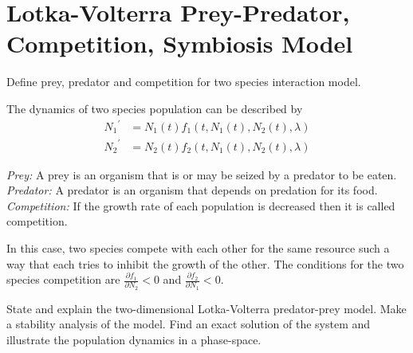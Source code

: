 \documentclass[../main-sheet.tex]{subfiles}
\begin{document}
\chapter{Lotka-Volterra Prey-Predator, Competition, Symbiosis Model}
\begin{prob}
    Define prey, predator and competition for two species interaction model.
\end{prob}
\begin{soln}
    The dynamics of two species population can be described by
    \begin{align*}
        {N_1}^{'}&=N_1(t)f_1(t,N_1(t),N_2(t),\lambda)\\
        {N_2}^{'}&=N_2(t)f_2(t,N_1(t),N_2(t),\lambda)
    \end{align*}


    \emph{Prey:} A prey is an organism that is or may be seized by a predator to be eaten.\\

    \emph{Predator:} A predator is an organism that depends on predation for its food.\\

    \emph{Competition:} If the growth rate of each population is decreased then it is called competition.

    In this case, two species compete with each other for the same resource such a way that each tries to inhibit the growth of the other. The conditions for the two species competition are \(\frac{\partial f_1}{\partial N_2}<0\) and \(\frac{\partial f_2}{\partial N_1}<0\).
\end{soln}
\begin{prob}
    State and explain the two-dimensional Lotka-Volterra predator-prey model. Make a stability analysis of the model. Find an exact solution of the system and illustrate the population dynamics in a phase-space.
\end{prob}
\end{document}
